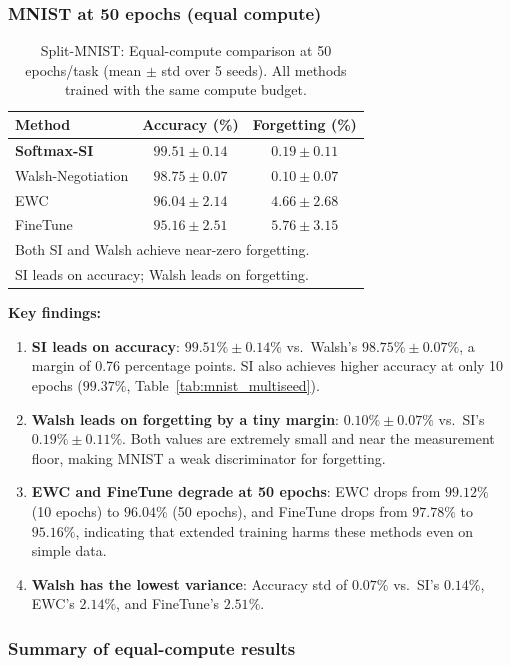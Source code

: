\documentclass[preprint,review,12pt]{elsarticle}
\begin{document}
\subsubsection{MNIST at 50 epochs (equal compute)}

\begin{table}[t]
\centering
\caption{Split-MNIST: Equal-compute comparison at 50 epochs/task (mean $\pm$ std over 5 seeds). All methods trained with the same compute budget.}
\label{tab:equal_compute_mnist}
\begin{tabular}{lcc}
\toprule
Method & Accuracy (\%) & Forgetting (\%) \\
\midrule
\textbf{Softmax-SI} & $\mathbf{99.51 \pm 0.14}$ & $0.19 \pm 0.11$ \\
Walsh-Negotiation & $98.75 \pm 0.07$ & $\mathbf{0.10 \pm 0.07}$ \\
EWC & $96.04 \pm 2.14$ & $4.66 \pm 2.68$ \\
FineTune & $95.16 \pm 2.51$ & $5.76 \pm 3.15$ \\
\bottomrule
\multicolumn{3}{l}{\scriptsize Both SI and Walsh achieve near-zero forgetting.} \\
\multicolumn{3}{l}{\scriptsize SI leads on accuracy; Walsh leads on forgetting.}
\end{tabular}
\end{table}

\textbf{Key findings:}
\begin{enumerate}
\item \textbf{SI leads on accuracy}: $99.51\% \pm 0.14\%$ vs.\ Walsh's $98.75\% \pm 0.07\%$, a margin of 0.76 percentage points. SI also achieves higher accuracy at only 10 epochs ($99.37\%$, Table~\ref{tab:mnist_multiseed}).
\item \textbf{Walsh leads on forgetting by a tiny margin}: $0.10\% \pm 0.07\%$ vs.\ SI's $0.19\% \pm 0.11\%$. Both values are extremely small and near the measurement floor, making MNIST a weak discriminator for forgetting.
\item \textbf{EWC and FineTune degrade at 50 epochs}: EWC drops from $99.12\%$ (10 epochs) to $96.04\%$ (50 epochs), and FineTune drops from $97.78\%$ to $95.16\%$, indicating that extended training harms these methods even on simple data.
\item \textbf{Walsh has the lowest variance}: Accuracy std of $0.07\%$ vs.\ SI's $0.14\%$, EWC's $2.14\%$, and FineTune's $2.51\%$.
\end{enumerate}

\subsubsection{Summary of equal-compute results}
\end{document}

